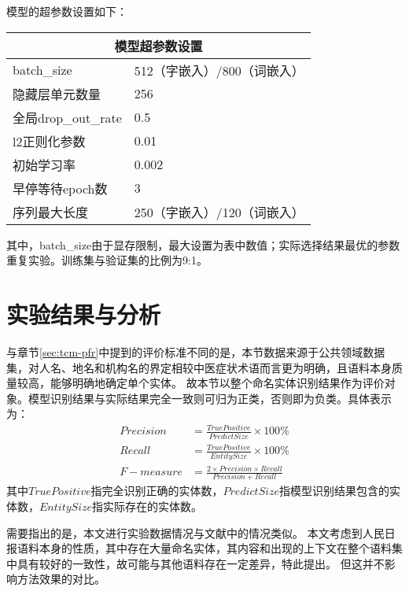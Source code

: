模型的超参数设置如下：
\begin{table}[H]
    \centering
    \begin{tabular}{ll}
        \toprule
        \multicolumn{2}{c}{模型超参数设置} \\
        \midrule
        batch\_size & 512（字嵌入）/800（词嵌入） \\
        隐藏层单元数量 & 256\\
        全局drop\_out\_rate & 0.5 \\
        l2正则化参数 & 0.01 \\
        初始学习率 & 0.002 \\
        早停等待epoch数 & 3\\
        序列最大长度 & 250（字嵌入）/120（词嵌入）\\
        \bottomrule
    \end{tabular}
\end{table}
其中，batch\_size由于显存限制，最大设置为表中数值；实际选择结果最优的参数重复实验。训练集与验证集的比例为9:1。

\section{实验结果与分析}
与章节\ref{sec:tcm-pfr}中提到的评价标准不同的是，本节数据来源于公共领域数据集，对人名、地名和机构名的界定相较中医症状术语而言更为明确，且语料本身质量较高，能够明确地确定单个实体。
故本节以整个命名实体识别结果作为评价对象。模型识别结果与实际结果完全一致则可归为正类，否则即为负类。具体表示为：
\begin{align}
    Precision &= \frac{True Positive}{Predict Size} \times 100\% \\
    Recall &= \frac{True Positive}{Entity Size} \times 100\% \\
    F-measure &= \frac{2\times Precision \times Recall}{Precision + Recall}
\end{align}
其中$True Positive$指完全识别正确的实体数，$Predict Size$指模型识别结果包含的实体数，$Entity Size$指实际存在的实体数。

需要指出的是，本文进行实验数据情况与文献中的情况类似。
本文考虑到人民日报语料本身的性质，其中存在大量命名实体，其内容和出现的上下文在整个语料集中具有较好的一致性，故可能与其他语料存在一定差异，特此提出。
但这并不影响方法效果的对比。

